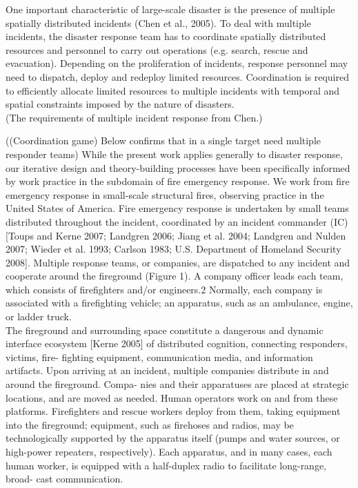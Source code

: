  One important characteristic of large-scale disaster is the presence of multiple spatially distributed incidents (Chen et al., 2005). To deal with multiple incidents, the disaster response team has to coordinate spatially distributed resources and personnel to carry out operations (e.g. search, rescue and evacuation). Depending on the proliferation of incidents, response personnel may need to dispatch, deploy and redeploy limited resources. Coordination is required to efficiently allocate limited resources to multiple incidents with temporal and spatial constraints imposed by the nature of disasters.\\

(The requirements of multiple incident response from Chen.)


((Coordination game) Below confirms that in a single target need multiple responder teams)
While the present work applies generally to disaster response, our iterative design and theory-building processes have been specifically informed by work practice in the subdomain of fire emergency response. We work from fire emergency response in small-scale structural fires, observing practice in the United States of America. Fire emergency response is undertaken by small teams distributed throughout the incident, coordinated by an incident commander (IC) [Toups and Kerne 2007; Landgren 2006; Jiang et al. 2004; Landgren and Nulden 2007; Wieder et al. 1993; Carlson 1983; U.S. Department of Homeland Security 2008]. Multiple response teams, or companies, are dispatched to any incident and cooperate around the fireground (Figure 1). A company officer leads each team, which consists of firefighters and/or engineers.2 Normally, each company is associated with a firefighting vehicle; an apparatus, such as an ambulance, engine, or ladder truck.\\

The fireground and surrounding space constitute a dangerous and dynamic interface ecosystem [Kerne 2005] of distributed cognition, connecting responders, victims, fire- fighting equipment, communication media, and information artifacts. Upon arriving at an incident, multiple companies distribute in and around the fireground. Compa- nies and their apparatuses are placed at strategic locations, and are moved as needed. Human operators work on and from these platforms. Firefighters and rescue workers deploy from them, taking equipment into the fireground; equipment, such as firehoses and radios, may be technologically supported by the apparatus itself (pumps and water sources, or high-power repeaters, respectively). Each apparatus, and in many cases, each human worker, is equipped with a half-duplex radio to facilitate long-range, broad- cast communication.\\

